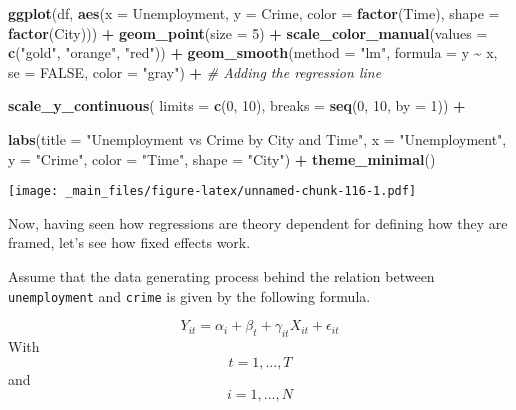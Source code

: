 \documentclass[
]{book}
\newenvironment{Shaded}{\begin{snugshade}}{\end{snugshade}}
\newcommand{\AttributeTok}[1]{\textcolor[rgb]{0.13,0.29,0.53}{#1}}
\newcommand{\CommentTok}[1]{\textcolor[rgb]{0.56,0.35,0.01}{\textit{#1}}}
\newcommand{\ConstantTok}[1]{\textcolor[rgb]{0.56,0.35,0.01}{#1}}
\newcommand{\DecValTok}[1]{\textcolor[rgb]{0.00,0.00,0.81}{#1}}
\newcommand{\FunctionTok}[1]{\textcolor[rgb]{0.13,0.29,0.53}{\textbf{#1}}}
\newcommand{\NormalTok}[1]{#1}
\newcommand{\SpecialCharTok}[1]{\textcolor[rgb]{0.81,0.36,0.00}{\textbf{#1}}}
\newcommand{\StringTok}[1]{\textcolor[rgb]{0.31,0.60,0.02}{#1}}
\begin{document}
\begin{Shaded}
\begin{Highlighting}[]
\FunctionTok{ggplot}\NormalTok{(df, }\FunctionTok{aes}\NormalTok{(}\AttributeTok{x =}\NormalTok{ Unemployment, }\AttributeTok{y =}\NormalTok{ Crime, }\AttributeTok{color =} \FunctionTok{factor}\NormalTok{(Time), }\AttributeTok{shape =} \FunctionTok{factor}\NormalTok{(City))) }\SpecialCharTok{+}
  \FunctionTok{geom\_point}\NormalTok{(}\AttributeTok{size =} \DecValTok{5}\NormalTok{) }\SpecialCharTok{+}
  \FunctionTok{scale\_color\_manual}\NormalTok{(}\AttributeTok{values =} \FunctionTok{c}\NormalTok{(}\StringTok{"gold"}\NormalTok{, }\StringTok{"orange"}\NormalTok{, }\StringTok{"red"}\NormalTok{)) }\SpecialCharTok{+}
  \FunctionTok{geom\_smooth}\NormalTok{(}\AttributeTok{method =} \StringTok{"lm"}\NormalTok{, }\AttributeTok{formula =}\NormalTok{ y }\SpecialCharTok{\textasciitilde{}}\NormalTok{ x, }\AttributeTok{se =} \ConstantTok{FALSE}\NormalTok{, }\AttributeTok{color =} \StringTok{"gray"}\NormalTok{) }\SpecialCharTok{+}  \CommentTok{\# Adding the regression line}

  \FunctionTok{scale\_y\_continuous}\NormalTok{(}
  \AttributeTok{limits =} \FunctionTok{c}\NormalTok{(}\DecValTok{0}\NormalTok{, }\DecValTok{10}\NormalTok{),}
  \AttributeTok{breaks =} \FunctionTok{seq}\NormalTok{(}\DecValTok{0}\NormalTok{, }\DecValTok{10}\NormalTok{, }\AttributeTok{by =} \DecValTok{1}\NormalTok{)) }\SpecialCharTok{+}
  
  \FunctionTok{labs}\NormalTok{(}\AttributeTok{title =} \StringTok{"Unemployment vs Crime by City and Time"}\NormalTok{,}
       \AttributeTok{x =} \StringTok{"Unemployment"}\NormalTok{,}
       \AttributeTok{y =} \StringTok{"Crime"}\NormalTok{,}
       \AttributeTok{color =} \StringTok{"Time"}\NormalTok{,}
       \AttributeTok{shape =} \StringTok{"City"}\NormalTok{) }\SpecialCharTok{+}
  \FunctionTok{theme\_minimal}\NormalTok{()}
\end{Highlighting}
\end{Shaded}

\texttt{[image: \_main\_files/figure-latex/unnamed-chunk-116-1.pdf]}

Now, having seen how regressions are theory dependent for defining how they are framed, let's see how fixed effects work.

Assume that the data generating process behind the relation between \texttt{unemployment} and \texttt{crime} is given by the following formula.

\[Y_{it}=\alpha_{i}+\beta_{t}+\gamma_{it}X_{it}+\epsilon_{it}\]
With \[t=1, ..., T\]
and
\[i=1, ..., N\]
\end{document}
